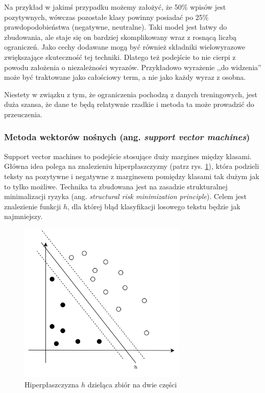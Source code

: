 Na przykład w jakimś przypadku
możemy założyć, że 50\% wpisów jest pozytywnych, wówczas pozostałe klasy
powinny posiadać po 25\% prawdopodobieństwa (negatywne, neutralne).
Taki model jest łatwy do zbudowania, ale staje się on bardziej skomplikowany
wraz z rosnącą liczbą ograniczeń. Jako cechy dodawane mogą być również
składniki wielowyrazowe zwiększające skuteczność tej techniki. Dlatego też
podejście to nie cierpi z powodu założenia o niezależności wyrazów.
Przykładowo wyrażenie ,,do widzenia'' może być traktowane jako całościowy term,
a nie jako każdy wyraz z osobna.

Niestety w związku z tym, że ograniczenia pochodzą z danych treningowych,
jest duża szansa, że dane te będą relatywnie rzadkie i metoda ta może prowadzić
do przeuczenia.


\subsubsection{Metoda wektorów nośnych (ang. \textit{support vector machines})}
Support vector machines to podejście stosujące duży margines między klasami.
Główna idea polega na znalezieniu hiperpłaszczyzny (patrz rys. \ref{image:svm}),
która podzieli teksty na pozytywne i negatywne z marginesem pomiędzy klasami tak
dużym jak to tylko możliwe.
Technika ta zbudowana jest na zasadzie strukturalnej minimalizacji ryzyka (ang.
\textit{structural risk minimization principle}). Celem jest znalezienie funkcji
$h$, dla której błąd klasyfikacji losowego tekstu będzie jak najmniejszy.


\begin{figure}[ht!]
\centering
\includegraphics[width=80mm]{img/svm.png}
\caption{Hiperpłaszczyzna $h$ dzieląca zbiór na dwie części}
\label{image:svm}
\end{figure}



